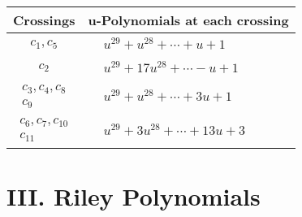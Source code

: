 \documentclass[1p]{elsarticle_modified}
\theoremstyle{definition}
\begin{document}
\begin{tabular}{m{50pt}|m{274pt}}
Crossings & \hspace{64pt}u-Polynomials at each crossing \\
\hline $$\begin{aligned}c_{1},c_{5}\end{aligned}$$&$\begin{aligned}
&u^{29}+u^{28}+\cdots+u+1
\end{aligned}$\\
\hline $$\begin{aligned}c_{2}\end{aligned}$$&$\begin{aligned}
&u^{29}+17 u^{28}+\cdots- u+1
\end{aligned}$\\
\hline $$\begin{aligned}c_{3},c_{4},c_{8}\\c_{9}\end{aligned}$$&$\begin{aligned}
&u^{29}+u^{28}+\cdots+3 u+1
\end{aligned}$\\
\hline $$\begin{aligned}c_{6},c_{7},c_{10}\\c_{11}\end{aligned}$$&$\begin{aligned}
&u^{29}+3 u^{28}+\cdots+13 u+3
\end{aligned}$\\
\hline
\end{tabular}\newpage\renewcommand{\arraystretch}{1}
\centering \section*{ III. Riley Polynomials}
\end{document}
